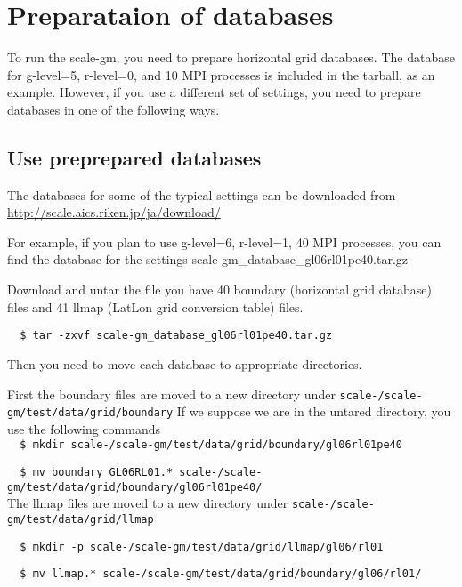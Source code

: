 \section{Preparataion of databases}

To run the scale-gm, you need to prepare horizontal grid databases. 
The database for g-level=5, r-level=0, and 10 MPI processes 
is included in the tarball, as an example.
However, if you use a different set of settings, you need to prepare databases 
in one of the following ways.
\subsection{Use preprepared databases}
The databases for some of the typical settings can be downloaded from 
\noindent \url{http://scale.aics.riken.jp/ja/download/}

For example, if you plan to use g-level=6, r-level=1, 40 MPI processes, 
you can find the database for the settings 
scale-gm\_database\_gl06rl01pe40.tar.gz

Download and untar the file you have 40 boundary (horizontal grid database)
files and 41 llmap (LatLon
grid conversion table) files. 
\begin{verbatim}
  $ tar -zxvf scale-gm_database_gl06rl01pe40.tar.gz
\end{verbatim}

\noindent Then you need to move each database to appropriate directories.

\noindent First the boundary files are moved to a new directory under 
\texttt{scale-{\version}/scale-gm/test/data/grid/boundary}
If we suppose we are in the untared directory, you use the following commands
\\

\verb|  $ mkdir scale-|{\version}\verb|/scale-gm/test/data/grid/boundary/gl06rl01pe40|

\verb|  $ mv boundary_GL06RL01.* scale-|{\version}\verb|/scale-gm/test/data/grid/boundary/gl06rl01pe40/|
\\

\noindent The llmap files are moved to a new directory under 
\texttt{scale-{\version}/scale-gm/test/data/grid/llmap}

\verb|  $ mkdir -p scale-|{\version}\verb|/scale-gm/test/data/grid/llmap/gl06/rl01|

\verb|  $ mv llmap.* scale-|{\version}\verb|/scale-gm/test/data/grid/boundary/gl06/rl01/| \\



